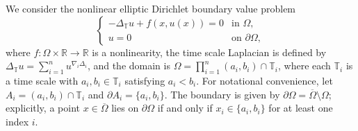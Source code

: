 \documentclass{article}
\numberwithin{equation}{section}
\numberwithin{theorem}{section}
\begin{document}
We consider the nonlinear elliptic Dirichlet boundary value problem
\begin{equation}\label{eq:Dirichlet}
\begin{cases}
-\Delta_{\mathbb{T}} u + f(x, u(x)) = 0 & \text{in } \Omega,\\
u = 0 & \text{on } \partial\Omega,
\end{cases}
\end{equation}
where $f\colon \Omega \times \mathbb{R} \to \mathbb{R}$ is a nonlinearity, the time scale Laplacian is defined by $\Delta_{\mathbb{T}} u = \displaystyle\sum_{i=1}^{n} u^{\nabla_i\Delta_i}$, and the domain is $\Omega = \displaystyle\prod_{i=1}^{n} (a_i, b_i) \cap \mathbb{T}_i$, where each $\mathbb{T}_i$ is a time scale with $a_i, b_i \in \mathbb{T}_i$ satisfying $a_i < b_i$. For notational convenience, let $A_i = (a_i, b_i) \cap \mathbb{T}_i$ and $\partial A_i = \{a_i, b_i\}$. The boundary is given by $\partial\Omega = \overline{\Omega} \setminus
\Omega$; explicitly, a point $x \in \overline{\Omega}$ lies on
$\partial\Omega$ if and only if $x_i \in \{a_i, b_i\}$ for at least one
index $i$.
\end{document}
